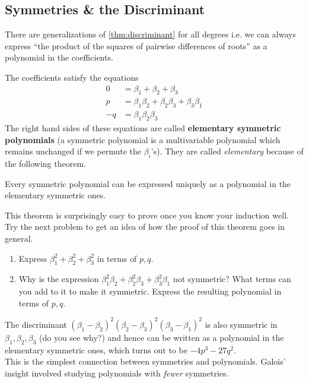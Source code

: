 \newpage
\subsection{Symmetries \& the Discriminant}

There are generalizations of \ref{thm:discriminant} for all degrees i.e. we can always express ``the product of the squares of pairwise differences of roots'' as a polynomial in the coefficients. 

The coefficients satisfy the equations 
\begin{align*}
	0  & = \beta_1 + \beta_2 + \beta_3                    \\
	p  & = \beta_1 \beta_2 + \beta_2 \beta_3 + \beta_3\beta_1 \\
	-q & = \beta_1 \beta_2 \beta_3                        
\end{align*}  
The right hand sides of these equations are called \textbf{elementary symmetric polynomials} (a symmetric polynomial is a multivariable polynomial which remains unchanged if we permute the $\beta_i$'s). They are called \emph{elementary} because of the following theorem.

\begin{thm}
	Every symmetric polynomial can be expressed uniquely as a polynomial in the elementary symmetric ones.
\end{thm}

This theorem is surprisingly easy to prove once you know your induction well. Try the next problem to get an idea of how the proof of this theorem goes in general.
\begin{questions}[resume]
	\item 
	\begin{enumerate}
		\item Express $ \beta_1^2 + \beta_2^2 + \beta_3^2$ in terms of $ p,q$. 
		
		\item Why is the expression $ \beta_1^2 \beta_2 + \beta_2^2 \beta_3  + \beta_3^2 \beta_1 $ not symmetric? What terms can you add to it to make it symmetric. Express the resulting polynomial in terms of $ p,q$. 
	\end{enumerate}
\end{questions}


The discriminant $(\beta_1 - \beta_2)^2(\beta_2 - \beta_3)^2(\beta_3 - \beta_1)^2$ is also symmetric in $ \beta_1, \beta_2, \beta_3$ (do you see why?) and hence can be written as a polynomial in the elementary symmetric ones, which turns out to be $-4p^3 - 27q^2$.\\

 This is the simplest connection between symmetries and polynomials. Galois' insight involved studying polynomials with \emph{fewer} symmetries.

